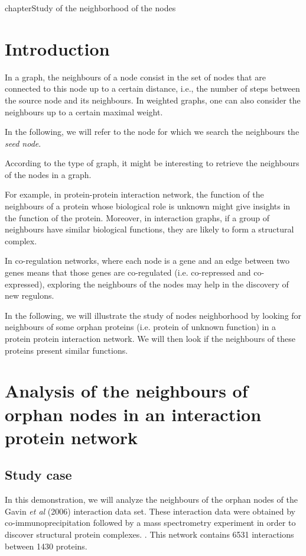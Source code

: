 chapter{Study of the neighborhood of the nodes}

\section{Introduction}

In a graph, the neighbours of a node consist in the set of nodes that
are connected to this node up to a certain distance, i.e., the number
of steps between the source node and its neighbours. In weighted
graphs, one can also consider the neighbours up to a certain maximal
weight.

In the following, we will refer to the node for which we search the
neighbours the \textit{seed node}.

According to the type of graph, it might be interesting to retrieve
the neighbours of the nodes in a graph.

For example, in protein-protein interaction network, the function of
the neighbours of a protein whose biological role is unknown might
give insights in the function of the protein.  Moreover, in
interaction graphs, if a group of neighbours have similar biological
functions, they are likely to form a structural complex.

In co-regulation networks, where each node is a gene and an edge
between two genes means that those genes are co-regulated
(i.e. co-repressed and co-expressed), exploring the neighbours of the
nodes may help in the discovery of new regulons.

In the following, we will illustrate the study of nodes neighborhood
by looking for neighbours of some orphan proteins (i.e. protein of
unknown function) in a protein protein interaction network. We will
then look if the neighbours of these proteins present similar
functions.

\section{Analysis of the neighbours of orphan nodes in an interaction protein network}
\subsection{Study case}

In this demonstration, we will analyze the neighbours of the orphan
nodes of the Gavin \textit{et al} (2006) interaction data set. These
interaction data were obtained by co-immunoprecipitation followed by a
mass spectrometry experiment in order to discover structural protein
complexes. \cite{Gavin2006}.  This network contains 6531 interactions
between 1430 proteins.


